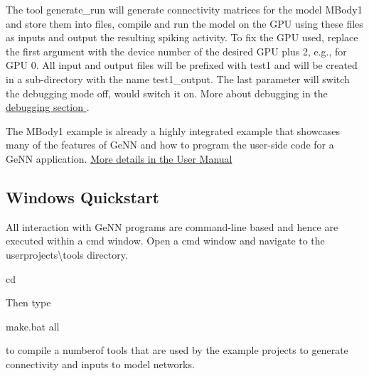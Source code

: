 The tool generate\+\_\+run will generate connectivity matrices for the model {\ttfamily M\+Body1} and store them into files, compile and run the model on the G\+P\+U using these files as inputs and output the resulting spiking activity. To fix the G\+P\+U used, replace the first argument {} with the device number of the desired G\+P\+U plus 2, e.\+g., {} for G\+P\+U 0. All input and output files will be prefixed with {\ttfamily test1} and will be created in a sub-\/directory with the name {\ttfamily test1\+\_\+output}. The last parameter {} will switch the debugging mode off, {} would switch it on. More about debugging in the \hyperlink{}{debugging section }.

The M\+Body1 example is already a highly integrated example that showcases many of the features of Ge\+N\+N and how to program the user-\/side code for a Ge\+N\+N application. \hyperlink{Manual}{More details in the User Manual }\hypertarget{Quickstart_page_windows_quick}{}\subsection{Windows Quickstart}\label{Quickstart_page_windows_quick}
All interaction with Ge\+N\+N programs are command-\/line based and hence are executed within a {\ttfamily cmd} window. Open a {\ttfamily cmd} window and navigate to the {\ttfamily userprojects\textbackslash{}tools} directory. 
\begin{DoxyCode}
cd %
\end{DoxyCode}
 Then type 
\begin{DoxyCode}
make.bat all
\end{DoxyCode}
 to compile a numberof tools that are used by the example projects to generate connectivity and inputs to model networks.


